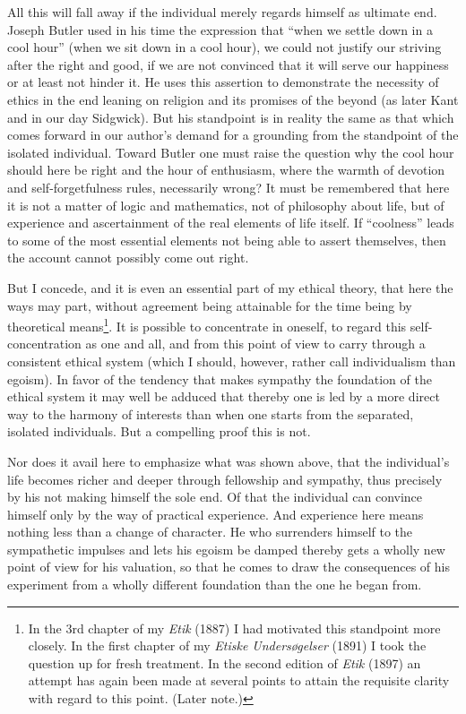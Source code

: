 \documentclass[12pt,a4paper,openany]{book}
\newcommand{\opage}[1]{\marginnote{\footnotesize\textit{[#1]}}}
\begin{document}
All this will fall away if the individual merely
regards himself as ultimate end. Joseph Butler used
in his time the expression that ``when we settle down in a cool
hour'' (when we sit down in a cool hour), we could not
justify our striving after the right and good, if
we are not convinced that it will serve our happiness
or at least not hinder it. He uses this
assertion to demonstrate the necessity of ethics
\opage{37}in the end leaning on religion and its promises of
the beyond (as later Kant and in our day
Sidgwick). But his standpoint is in reality the same
as that which comes forward in our author's demand for
a grounding from the standpoint of the isolated individual.
Toward Butler one must raise the question why
the cool hour should here be right and the hour of
enthusiasm, where the warmth of devotion and self-forgetfulness rules,
necessarily wrong? It must be remembered that here it is not
a matter of logic and mathematics, not of philosophy about life, but
of experience and ascertainment of the real elements of life itself.
If ``coolness'' leads to some of the most essential
elements not being able to assert themselves, then the account
cannot possibly come out right.

But I concede, and it is even an essential part
of my ethical theory, that here the ways may part, without
agreement being attainable for the time being by theoretical means\footnote{In the 3rd chapter of my \emph{Etik} (1887) I had motivated this standpoint more closely. In the first chapter of my \emph{Etiske Undersøgelser}
(1891) I took the question up for fresh treatment. In the second
edition of \emph{Etik} (1897) an attempt has again been made at several points %
 to attain
the requisite clarity with regard to this point. (Later note.)}. It
is possible to concentrate in oneself, to regard this
self-concentration as one and all, and from this
point of view to carry through a consistent ethical system (which I
should, however, rather call individualism than egoism). In
favor of the tendency that makes sympathy the foundation of
the ethical system it may well be adduced that thereby one is led by a
more direct way to the harmony of interests than when one
starts from the separated, isolated individuals. But a compelling
proof this is not.

Nor does it avail here to emphasize what was
shown above, that the individual's life becomes richer and deeper
through fellowship and sympathy, thus precisely by his
not making himself the sole end. Of that the individual can
convince himself only by the way of practical experience.
And experience here means nothing less than a
\opage{38}change of character. He who surrenders himself to the sympathetic
impulses and lets his egoism be damped thereby gets a wholly new
point of view for his valuation, so that he comes to draw
the consequences of his experiment from a wholly different
foundation than the one he began from.
\end{document}
